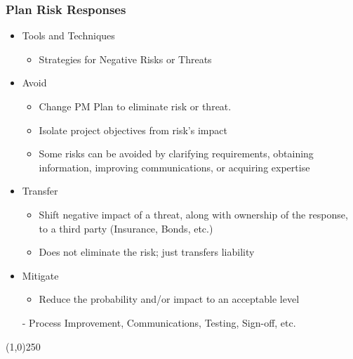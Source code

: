 \begin{frame}
\frametitle{Plan Risk Responses}
\begin{itemize}
\item Tools and Techniques
\begin{itemize}
	\item Strategies for Negative Risks or Threats
\end{itemize}
\item Avoid
\begin{itemize}
	\item Change PM Plan to eliminate risk or threat.
\item Isolate project objectives from risk's impact
\item Some risks can be avoided by clarifying requirements, obtaining information, improving communications, or acquiring expertise
\end{itemize}
\item Transfer
\begin{itemize}
	\item Shift negative impact of a threat, along with ownership of the response, to a third party (Insurance, Bonds, etc.)
\item Does not eliminate the risk; just transfers liability
\end{itemize}
\item Mitigate
\begin{itemize}
	\item Reduce the probability and/or impact to an acceptable level
\end{itemize}
- Process Improvement, Communications, Testing, Sign-off, etc.
\end{itemize}
\end{frame}\begin{center}\line(1,0){250}\end{center}



